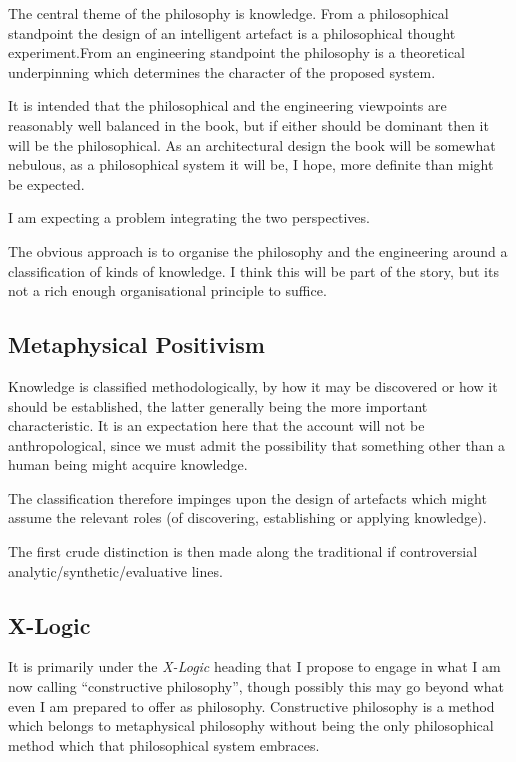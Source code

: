 \documentclass[numreferences]{rbjk}
\begin{document}
\begin{article}
The central theme of the philosophy is knowledge.
From a philosophical standpoint the design of an intelligent artefact is a philosophical thought experiment.From an engineering standpoint the philosophy is a theoretical underpinning which determines the character of the proposed system.

It is intended that the philosophical and the engineering viewpoints are reasonably well balanced in the book, but if either should be dominant then it will be the philosophical.
As an architectural design the book will be somewhat nebulous, as a philosophical system it will be, I hope, more definite than might be expected.

I am expecting a problem integrating the two perspectives.

The obvious approach is to organise the philosophy and the engineering around a classification of kinds of knowledge.
I think this will be part of the story, but its not a rich enough organisational principle to suffice.

\subsection{Metaphysical Positivism}

Knowledge is classified methodologically, by how it may be discovered or how it should be established, the latter generally being the more important characteristic.
It is an expectation here that the account will not be anthropological, since we must admit the possibility that something other than a human being might acquire knowledge.

The classification therefore impinges upon the design of artefacts which might assume the relevant roles (of discovering, establishing or applying knowledge).

The first crude distinction is then made along the traditional if controversial analytic/synthetic/evaluative lines.

\subsection{X-Logic}

It is primarily under the {\it X-Logic} heading that I propose to engage in what I am now calling ``constructive philosophy'', though possibly this may go beyond what even I am prepared to offer as philosophy.
Constructive philosophy is a method which belongs to metaphysical philosophy without being the only philosophical method which that philosophical system embraces.


\end{article}
\end{document}

